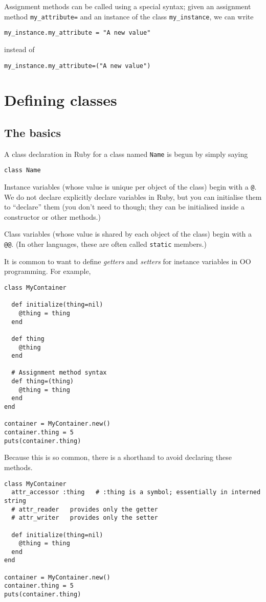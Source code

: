 \documentclass[11pt]{article}
\begin{document}
Assignment methods can be called using a special syntax;
given an assignment method \texttt{my\_attribute=} and
an instance of the class \texttt{my\_instance},
we can write
\begin{verbatim}
my_instance.my_attribute = "A new value"
\end{verbatim}
instead of
\begin{verbatim}
my_instance.my_attribute=("A new value")
\end{verbatim}

\section{Defining classes}
\label{sec:org25c99ed}
\subsection{The basics}
\label{sec:org9098bf3}
A class declaration in Ruby for a class named \texttt{Name} is
begun by simply saying
\begin{verbatim}
class Name
\end{verbatim}

Instance variables
(whose value is unique per object of the class)
begin with a \texttt{@}.
We do not declare explicitly declare variables in Ruby,
but you can initialise them to “declare” them
(you don't need to though; they can be initialised inside
a constructor or other methods.)

Class variables
(whose value is shared by each object of the class)
begin with a \texttt{@@}.
(In other languages, these are often called \texttt{static} members.)

It is common to want to define \emph{getters} and \emph{setters} for instance
variables in OO programming.
For example,
\begin{verbatim}
class MyContainer
  
  def initialize(thing=nil)
    @thing = thing
  end

  def thing
    @thing
  end

  # Assignment method syntax
  def thing=(thing)
    @thing = thing
  end
end

container = MyContainer.new()
container.thing = 5
puts(container.thing)
\end{verbatim}

Because this is so common, there is a shorthand
to avoid declaring these methods.
\begin{verbatim}
class MyContainer
  attr_accessor :thing   # :thing is a symbol; essentially in interned string
  # attr_reader   provides only the getter
  # attr_writer   provides only the setter

  def initialize(thing=nil)
    @thing = thing
  end
end

container = MyContainer.new()
container.thing = 5
puts(container.thing)
\end{verbatim}
\end{document}
